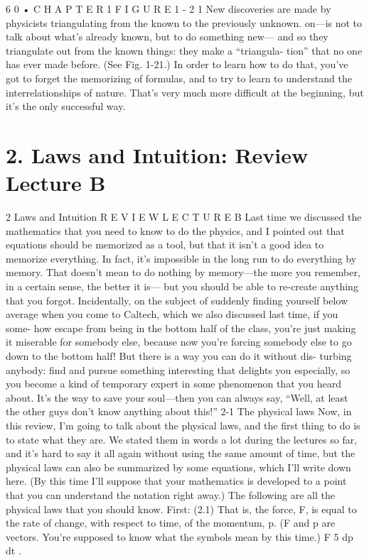 \documentclass[10pt,oneside]{article}
\begin{document}
6 0 • C H A P T E R  1 F I G U R E 1 - 2 1 New discoveries are made by physicists triangulating from the known to the previously unknown. on---is not to talk about what’s already known, but to do something new--- and so they triangulate out from the known things: they make a “triangula- tion” that no one has ever made before. (See Fig. 1-21.) In order to learn how to do that, you’ve got to forget the memorizing of formulas, and to try to learn to understand the interrelationships of nature. That’s very much more difficult at the beginning, but it’s the only successful way.\par

\clearpage
{}
\section*{2. Laws and Intuition: Review Lecture B}
\label{tips-sec-10-2-laws-and-intuition-review-lecture-b}
2 Laws and Intuition R E V I E W  L E C T U R E  B Last time we discussed the mathematics that you need to know to do the physics, and I pointed out that equations should be memorized as a tool, but that it isn’t a good idea to memorize everything. In fact, it’s impossible in the long run to do everything by memory. That doesn’t mean to do nothing by memory---the more you remember, in a certain sense, the better it is--- but you should be able to re-create anything that you forgot. Incidentally, on the subject of suddenly finding yourself below average when you come to Caltech, which we also discussed last time, if you some- how escape from being in the bottom half of the class, you’re just making it miserable for somebody else, because now you’re forcing somebody else to go down to the bottom half! But there is a way you can do it without dis- turbing anybody: find and pursue something interesting that delights you especially, so you become a kind of temporary expert in some phenomenon that you heard about. It’s the way to save your soul---then you can always say, “Well, at least the other guys don’t know anything about this!” 2-1 The physical laws Now, in this review, I’m going to talk about the physical laws, and the first thing to do is to state what they are. We stated them in words a lot during the lectures so far, and it’s hard to say it all again without using the same amount of time, but the physical laws can also be summarized by some equations, which I’ll write down here. (By this time I’ll suppose that your mathematics is developed to a point that you can understand the notation right away.) The following are all the physical laws that you should know. First: (2.1) That is, the force, F, is equal to the rate of change, with respect to time, of the momentum, p. (F and p are vectors. You’re supposed to know what the symbols mean by this time.) F 5 dp dt .\par
\end{document}
